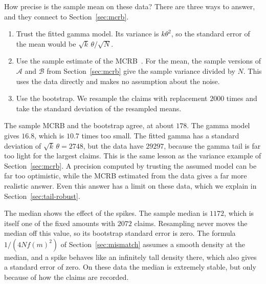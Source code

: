 \documentclass[11pt]{article}
\numberwithin{figure}{section}
\numberwithin{equation}{section}
\begin{document}
How precise is the sample mean on these data? There are three ways to answer, and they connect to
Section~\ref{sec:mcrb}.
\begin{enumerate}
  \item Trust the fitted gamma model. Its variance is $k\theta^2$, so the standard error of the mean
        would be $\sqrt{k}\,\theta/\sqrt{N}$.
  \item Use the sample estimate of the MCRB~\cite[Section~4.1]{fortunati}. For the mean, the sample
        versions of $\mathcal{A}$ and $\mathcal{B}$ from Section~\ref{sec:mcrb} give the sample variance
        divided by $N$. This uses the data directly and makes no assumption about the noise.
  \item Use the bootstrap. We resample the claims with replacement $2000$ times and take the
        standard deviation of the resampled means.
\end{enumerate}

\begin{table}[H]
\centering
{}
\caption{The typical claim estimated by the mean and the median, with standard errors.}
\label{tab:real-se}
\end{table}

The sample MCRB and the bootstrap agree, at about $178$. The gamma model gives $16.8$, which is
$10.7$ times too small. The fitted gamma has a standard deviation of $\sqrt{k}\,\theta = 2748$, but the
data have $29297$, because the gamma tail is far too light for the largest claims. This is the same
lesson as the variance example of Section~\ref{sec:mcrb}. A precision computed by trusting the
assumed model can be far too optimistic, while the MCRB estimated from the data gives a far more
realistic answer. Even this answer has a limit on these data, which we explain in
Section~\ref{sec:tail-robust}.

The median shows the effect of the spikes. The sample median is $1172$, which is itself one of the
fixed amounts with $2072$ claims. Resampling never moves the median off this value, so its bootstrap
standard error is zero. The formula $1/(4Nf(m)^2)$ of Section~\ref{sec:mismatch} assumes a smooth
density at the median, and a spike behaves like an infinitely tall density there, which also gives a
standard error of zero. On these data the median is extremely stable, but only because of how the
claims are recorded.
\end{document}
